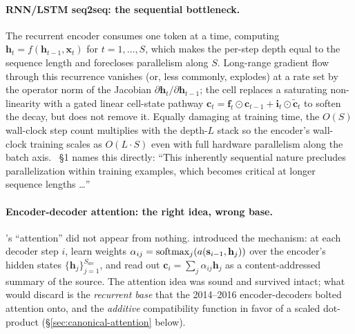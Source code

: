 \paragraph{RNN/LSTM seq2seq: the sequential bottleneck.} The
recurrent encoder consumes one token at a time, computing
$\mathbf{h}_t = f(\mathbf{h}_{t-1}, \mathbf{x}_t)$ for $t = 1, \ldots, S$,
which makes the per-step depth equal to the sequence length and
forecloses parallelism along $S$. Long-range gradient flow through
this recurrence vanishes (or, less commonly, explodes) at a rate set
by the operator norm of the Jacobian
$\partial \mathbf{h}_t / \partial \mathbf{h}_{t-1}$; the  cell
 replaces a saturating
non-linearity with a gated linear cell-state pathway
$\mathbf{c}_t = \mathbf{f}_t \odot \mathbf{c}_{t-1} + \mathbf{i}_t \odot \tilde{\mathbf{c}}_t$
to soften the decay, but does not remove it. Equally damaging at
training time, the $O(S)$ wall-clock step count multiplies with the
depth-$L$ stack so the encoder's wall-clock training scales as
$O(L \cdot S)$ even with full hardware parallelism along the batch
axis. \citet{vaswani2017}~\S 1 names this directly: ``This
inherently sequential nature precludes parallelization within
training examples, which becomes critical at longer sequence lengths
\dots''

\paragraph{Encoder-decoder attention: the right idea, wrong base.}
\citet{vaswani2017}'s ``attention'' did not appear from nothing.
 introduced
the mechanism: at each decoder step $i$, learn weights
$\alpha_{ij} = \operatorname{softmax}_j(a(\mathbf{s}_{i-1}, \mathbf{h}_j))$ over the
encoder's hidden states $\{\mathbf{h}_j\}_{j=1}^{S_{\text{src}}}$, and
read out $\mathbf{c}_i = \sum_j \alpha_{ij} \mathbf{h}_j$ as a
content-addressed summary of the source. The attention idea was sound
and survived intact; what \citet{vaswani2017} would discard is the
\emph{recurrent base} that the 2014--2016 encoder-decoders bolted
attention onto, and the \emph{additive} compatibility function in
favor of a scaled dot-product (\S\ref{sec:canonical-attention} below).

